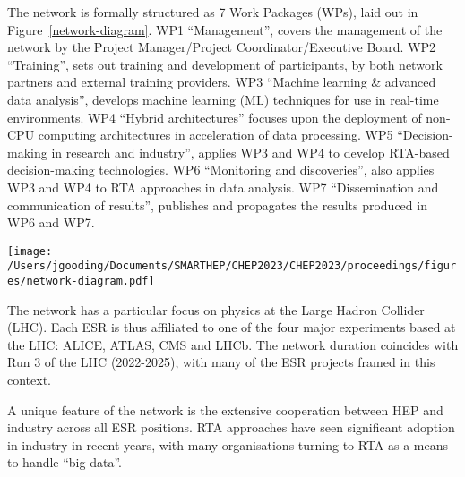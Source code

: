 The network is formally structured as 7 Work Packages (WPs), laid out in Figure~\ref{network-diagram}. WP1 ``Management'', covers the management of the network by the Project Manager/Project Coordinator/Executive Board. WP2 ``Training'', sets out training and development of participants, by both network partners and external training providers. WP3 ``Machine learning \& advanced data analysis'', develops machine learning (ML) techniques for use in real-time environments. WP4 ``Hybrid architectures'' focuses upon the deployment of non-CPU computing architectures in acceleration of data processing. WP5 ``Decision-making in research and industry'', applies WP3 and WP4 to develop RTA-based decision-making technologies. WP6 ``Monitoring and discoveries'', also applies WP3 and WP4 to RTA approaches in data analysis. WP7 ``Dissemination and communication of results'', publishes and propagates the results produced in WP6 and WP7.\par
\begin{figure*}[h!]
    \centering
    \texttt{[image: /Users/jgooding/Documents/SMARTHEP/CHEP2023/CHEP2023/proceedings/figures/network-diagram.pdf]}
    \caption{The structure of work packages within the SMARTHEP network. WP1 and WP2 define the organisation of the network; WP3 and WP4 introduce the techniques and tools of real-time analysis to the network; WP5 and WP6 use said techniques and tools to produce results for HEP and industry; WP7 makes these results available and promotes their wider use and adoption.}
    \label{network-diagram}       %
\end{figure*}

The network has a particular focus on physics at the Large Hadron Collider (LHC). Each ESR is thus affiliated to one of the four major experiments based at the LHC: ALICE, ATLAS, CMS and LHCb. The network duration coincides with Run 3 of the LHC (2022-2025), with many of the ESR projects framed in this context.\par

A unique feature of the network is the extensive cooperation between HEP and industry across all ESR positions.  RTA approaches have seen significant adoption in industry in recent years, with many organisations turning to RTA as a means to handle ``big data''.\par